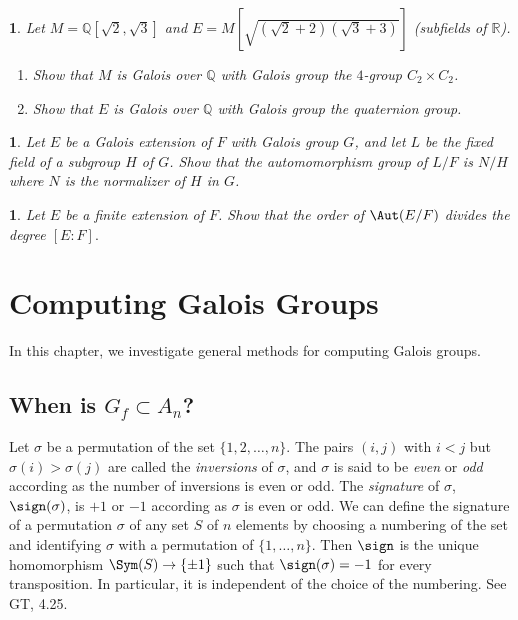 \documentclass[a4paper,11pt,final,openany]{memoir}
\newtheorem{exercise}[Y]{}
\theoremstyle{nonumberplain}
\begin{document}
\begin{exercise}
\label{x13} Let $M={\mathbb{Q}}[\sqrt{2},\sqrt{3}]$ and $E=M[\sqrt{(\sqrt
{2}+2)(\sqrt{3}+3)}]$ (subfields of $\mathbb{R}$).

\begin{enumerate}
\item Show that $M$ is Galois over ${\mathbb{Q}}$ with Galois group the
$4$-group $C_{2}\times C_{2}$.

\item Show that $E$ is Galois over ${\mathbb{Q}}$ with Galois group the
quaternion group.
\end{enumerate}
\end{exercise}

\begin{exercise}
\label{x13a}Let $E$ be a Galois extension of $F$ with Galois group $G$, and
let $L$ be the fixed field of a subgroup $H$ of $G$. Show that the
automomorphism group of $L/F$ is $N/H$ where $N$ is the normalizer of $H$ in
$G$.
\end{exercise}

\begin{exercise}
\label{x13b}Let $E$ be a finite extension of $F$. Show that the order of
$\Aut(E/F)$ divides the degree $[E\colon F].$
\end{exercise}

\clearpage


\chapter{Computing Galois Groups}

In this chapter, we investigate general methods for computing Galois groups.

\section{When is \texorpdfstring{$G_{f}\subset A_{n}$}{Gf in An}?}

Let $\sigma$ be a permutation of the set $\{1,2,\ldots,n\}$. The pairs $(i,j)$
with $i<j$ but $\sigma(i)>\sigma(j)$ are called the \emph{inversions} of
$\sigma$, and $\sigma$ is said to be \emph{even} or \emph{odd} according as
the number of inversions is even or odd. The \emph{signature} of $\sigma$,
$\sign(\sigma)$, is $+1$ or $-1$ according as $\sigma$ is even or odd. We can
define the signature of a permutation $\sigma$ of any set $S$ of $n$ elements
by choosing a numbering of the set and identifying $\sigma$ with a permutation
of $\{1,\ldots,n\}$. Then $\sign$ is the unique homomorphism
$\Sym(S)\rightarrow\{\pm1\}$ such that $\sign(\sigma)=-1$ for every
transposition. In particular, it is independent of the choice of the
numbering. See GT, 4.25.
\end{document}
